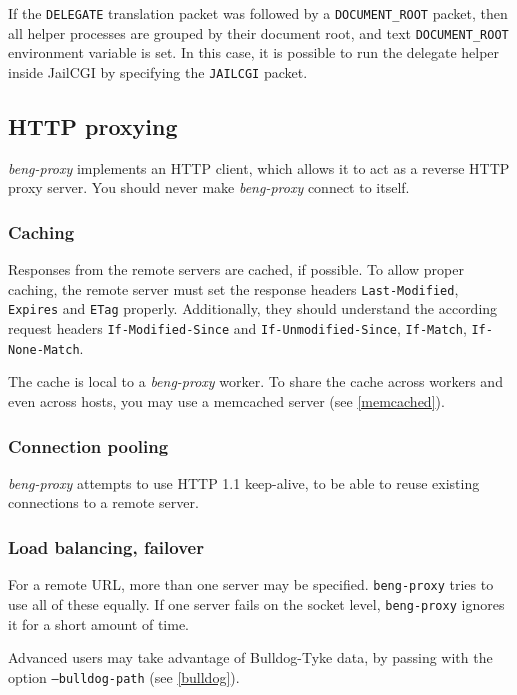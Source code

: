 \documentclass[a4paper,12pt]{article}
\begin{document}
If the \texttt{DELEGATE} translation packet was followed by a
\texttt{DOCUMENT\_ROOT} packet, then all helper processes are grouped
by their document root, and text \texttt{DOCUMENT\_ROOT} environment
variable is set.  In this case, it is possible to run the delegate
helper inside JailCGI by specifying the \texttt{JAILCGI} packet.

\subsection{HTTP proxying}
\label{http}

\emph{beng-proxy} implements an HTTP client, which allows it to act as
a reverse HTTP proxy server.  You should never make \emph{beng-proxy}
connect to itself.

\subsubsection{Caching}
\label{caching}

Responses from the remote servers are cached, if possible.  To allow
proper caching, the remote server must set the response headers
\texttt{Last-Modified}, \texttt{Expires} and \texttt{ETag} properly.
Additionally, they should understand the according request headers
\texttt{If-Modified-Since} and \texttt{If-Unmodified-Since},
\texttt{If-Match}, \texttt{If-None-Match}.

The cache is local to a \emph{beng-proxy} worker.  To share the cache
across workers and even across hosts, you may use a memcached server
(see \ref{memcached}).

\subsubsection{Connection pooling}

\emph{beng-proxy} attempts to use HTTP 1.1 keep-alive, to be able to
reuse existing connections to a remote server.

\subsubsection{Load balancing, failover}
\label{balancing}

For a remote URL, more than one server may be specified.
\texttt{beng-proxy} tries to use all of these equally.  If one server
fails on the socket level, \texttt{beng-proxy} ignores it for a short
amount of time.

Advanced users may take advantage of Bulldog-Tyke data, by passing
with the option \texttt{--bulldog-path} (see \ref{bulldog}).
\end{document}
